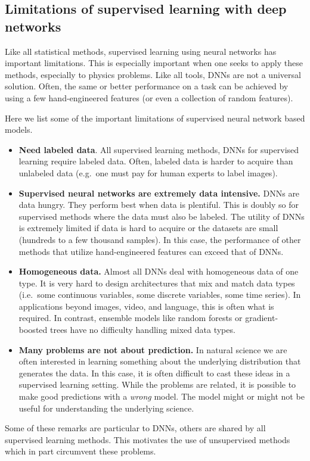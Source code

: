 \documentclass[%
oneside,                 %
final,                   %
10pt]{article}
\begin{document}
\subsection{Limitations of supervised learning with deep networks}

Like all statistical methods, supervised learning using neural
networks has important limitations. This is especially important when
one seeks to apply these methods, especially to physics problems. Like
all tools, DNNs are not a universal solution. Often, the same or
better performance on a task can be achieved by using a few
hand-engineered features (or even a collection of random
features). 

Here we list some of the important limitations of supervised neural network based models. 



\begin{itemize}
\item \textbf{Need labeled data}. All supervised learning methods, DNNs for supervised learning require labeled data. Often, labeled data is harder to acquire than unlabeled data (e.g.~one must pay for human experts to label images).

\item \textbf{Supervised neural networks are extremely data intensive.} DNNs are data hungry. They perform best when data is plentiful. This is doubly so for supervised methods where the data must also be labeled. The utility of DNNs is extremely limited if data is hard to acquire or the datasets are small (hundreds to a few thousand samples). In this case, the performance of other methods that utilize hand-engineered features can exceed that of DNNs.

\item \textbf{Homogeneous data.} Almost all DNNs deal with homogeneous data of one type. It is very hard to design architectures that mix and match data types (i.e.~some continuous variables, some discrete variables, some time series). In applications beyond images, video, and language, this is often what is required. In contrast, ensemble models like random forests or gradient-boosted trees have no difficulty handling mixed data types.

\item \textbf{Many problems are not about prediction.} In natural science we are often interested in learning something about the underlying distribution that generates the data. In this case, it is often difficult to cast these ideas in a supervised learning setting. While the problems are related, it is possible to make good predictions with a \emph{wrong} model. The model might or might not be useful for understanding the underlying science.
\end{itemize}

\noindent
Some of these remarks are particular to DNNs, others are shared by all supervised learning methods. This motivates the use of unsupervised methods which in part circumvent these problems.




\end{document}
